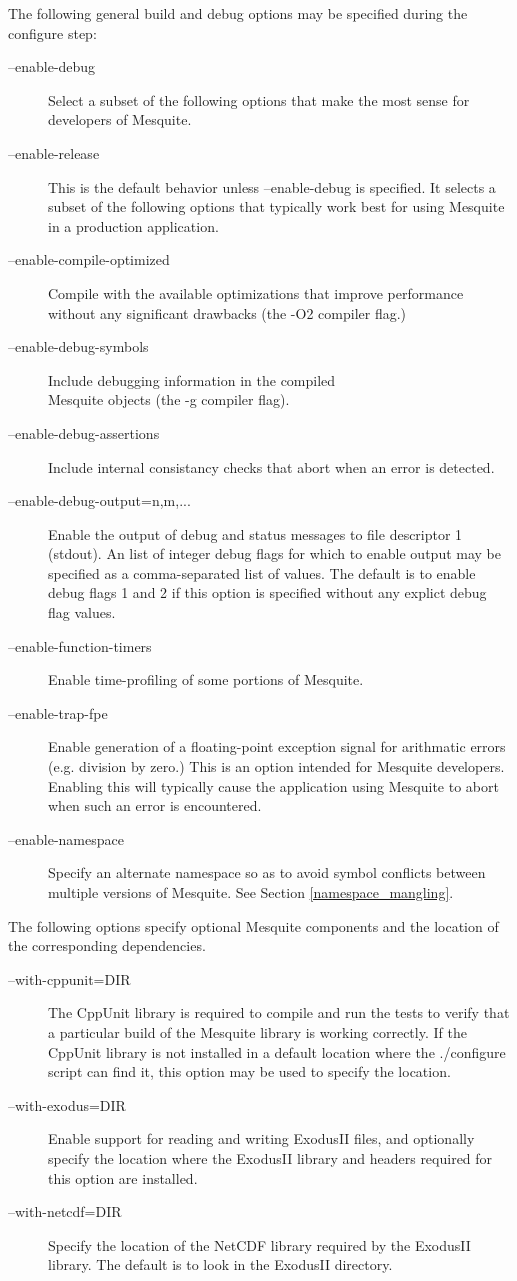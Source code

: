 \label{config_options}
The following general build and debug options may be specified during the configure step:
\begin{description}
\item[--enable-debug]  Select a subset of the following options that
make the most sense for developers of Mesquite.
\item[--enable-release]  This is the default behavior unless 
--enable-debug is specified.  It selects a subset of the following options that
typically work best for using Mesquite in a production application.
\item[--enable-compile-optimized] Compile with the available 
optimizations that improve performance without any significant drawbacks 
(the -O2 compiler flag.)
\item[--enable-debug-symbols] Include debugging information in
the compiled \\ Mesquite objects (the -g compiler flag).
\item[--enable-debug-assertions]  Include internal consistancy 
checks that abort when an error is detected.
\item[--enable-debug-output=n,m,...]  Enable the output of
debug and status messages to file descriptor 1 (stdout).  An 
list of integer debug flags for which to enable output may be specified 
as a comma-separated list of values.  The default is to enable debug
flags 1 and 2 if this option is specified without any explict debug
flag values.
\item[--enable-function-timers]  Enable time-profiling of
some portions of Mesquite.
\item[--enable-trap-fpe]  Enable generation of a floating-point
exception signal for arithmatic errors (e.g. division by zero.)  This is
an option intended for Mesquite developers.  Enabling this will typically cause
the application using Mesquite to abort when such an error is encountered.
\item[--enable-namespace]  Specify an alternate namespace so as to avoid
symbol conflicts between multiple versions of Mesquite.  See Section \ref{namespace_mangling}.
\end{description}

The following options specify optional Mesquite components and the location 
of the corresponding dependencies.
\begin{description}
\item[--with-cppunit=DIR]  The CppUnit library is required to compile
and run the tests to verify that a particular build of the Mesquite library
is working correctly.  If the CppUnit library is not installed in a default location
where the ./configure script can find it, this option may be used to specify
the location.
\item[--with-exodus=DIR]  Enable support for reading and writing
ExodusII files, and optionally specify the location where the ExodusII library
and headers required for this option are installed.
\item[--with-netcdf=DIR]  Specify the location of the NetCDF library
required by the ExodusII library.  The default is to look in the ExodusII
directory.
\end{description}

